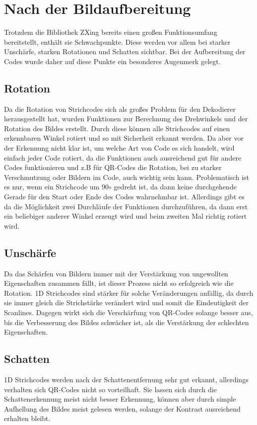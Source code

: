 \section{Nach der Bildaufbereitung}
\writtenby{\dcauthornameriren}%
Trotzdem die Bibliothek ZXing bereits einen großen Funktionsumfang bereitstellt, enthält sie Schwachpunkte. Diese werden vor allem bei starker Unschärfe, starken Rotationen und Schatten sichtbar.
Bei der Aufbereitung der Codes wurde daher auf diese Punkte ein besonderes Augenmerk gelegt.


\subsection*{Rotation}
Da die Rotation von Strichcodes sich als großes Problem für den Dekodierer herausgestellt hat, wurden Funktionen zur Berechnung des Drehwinkels und der Rotation des Bildes erstellt. Durch diese können alle Strichcodes auf einen erkennbaren Winkel rotiert und so mit Sicherheit erkannt werden.
Da aber vor der Erkennung nicht klar ist, um welche Art von Code es sich handelt, wird einfach jeder Code rotiert, da die Funktionen auch ausreichend gut für andere Codes funktionieren und z.B für QR-Codes die Rotation, bei zu starker Verschmutzung oder Bildern im Code, auch wichtig sein kann.
Problematisch ist es nur, wenn ein Strichcode um 90$ \circ $ gedreht ist, da dann keine durchgehende Gerade für den Start oder Ende des Codes wahrnehmbar ist. Allerdings gibt es da die Möglichkeit zwei Durchläufe der Funktionen durchzuführen, da dann erst ein beliebiger anderer Winkel erzeugt wird und beim zweiten Mal richtig rotiert wird.


\subsection*{Unschärfe}
Da das Schärfen von Bildern immer mit der Verstärkung von ungewollten Eigenschaften zusammen fällt, ist dieser Prozess nicht so erfolgreich wie die Rotation. 1D Strichcodes sind stärker für solche Veränderungen anfällig, da durch sie immer gleich die Strichstärke verändert wird und somit die Eindeutigkeit der Scanlines. Dagegen wirkt sich die Verschärfung von QR-Codes solange besser aus, bis die Verbesserung des Bildes schwächer ist, als die Verstärkung der schlechten Eigenschaften. 


\subsection*{Schatten}
1D Strichcodes werden nach der Schattenentfernung sehr gut erkannt, allerdings verhalten sich QR-Codes nicht so vorteilhaft. Sie lassen sich durch die Schattenerkennung meist nicht besser Erkennung, können aber durch simple Aufhellung des Bildes meist gelesen werden, solange der Kontrast ausreichend erhalten bleibt.

